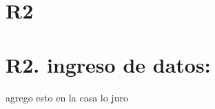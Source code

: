 \section*{R2}

\newpage

\section*{R2. ingreso de datos: }

agrego esto en la casa lo juro 

\begin{itemize}
    \nombreAlumno{} %
    \rutAlumno{} %
    \nombreProfesor{} %
    \rutProfesor{} %
    \notaFinal{} %
    \fechaRegistroNota{} %
    \reqObli{} %
    \verDatos{} %
    \verNotaFinal{} %
\end{itemize}





